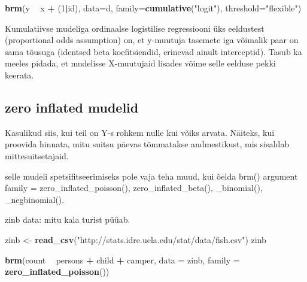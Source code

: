 \documentclass[]{book}
\newenvironment{Shaded}{\begin{snugshade}}{\end{snugshade}}
\newcommand{\DataTypeTok}[1]{\textcolor[rgb]{0.13,0.29,0.53}{#1}}
\newcommand{\DecValTok}[1]{\textcolor[rgb]{0.00,0.00,0.81}{#1}}
\newcommand{\KeywordTok}[1]{\textcolor[rgb]{0.13,0.29,0.53}{\textbf{#1}}}
\newcommand{\NormalTok}[1]{#1}
\newcommand{\OperatorTok}[1]{\textcolor[rgb]{0.81,0.36,0.00}{\textbf{#1}}}
\newcommand{\StringTok}[1]{\textcolor[rgb]{0.31,0.60,0.02}{#1}}
\begin{document}
\begin{Shaded}
\begin{Highlighting}[]
\KeywordTok{brm}\NormalTok{(y }\OperatorTok{~}\StringTok{ }\NormalTok{x }\OperatorTok{+}\StringTok{ }\NormalTok{(}\DecValTok{1}\OperatorTok{|}\NormalTok{id), }
    \DataTypeTok{data=}\NormalTok{d, }
    \DataTypeTok{family=}\KeywordTok{cumulative}\NormalTok{(}\StringTok{"logit"}\NormalTok{), }
    \DataTypeTok{threshold=}\StringTok{"flexible"}\NormalTok{)}
\end{Highlighting}
\end{Shaded}

Kumulatiivse mudeliga ordinaalse logistilise regressiooni üks eeldustest (proportional odds assumption) on, et y-muutuja tasemete iga võimalik paar on sama tõusuga (identsed beta koefitsiendid, erinevad ainult interceptid). Tasub ka meeles pidada, et mudelisse X-muutujaid lisades võime selle eelduse pekki keerata.

\hypertarget{zero-inflated-mudelid}{%
\subsection{zero inflated mudelid}\label{zero-inflated-mudelid}}

Kasulikud siis, kui teil on Y-s rohkem nulle kui võiks arvata.
Näiteks, kui proovida hinnata, mitu suitsu päevas tõmmatakse andmestikust, mis sisaldab mittesuitsetajaid.

selle mudeli spetsifitseerimiseks pole vaja teha muud, kui õelda brm() argument family = zero\_inflated\_poisson(), zero\_inflated\_beta(), \_binomial(), \_negbinomial().

zinb data: mitu kala turist püüab.

\begin{Shaded}
\begin{Highlighting}[]
\NormalTok{zinb <-}\StringTok{ }\KeywordTok{read_csv}\NormalTok{(}\StringTok{"http://stats.idre.ucla.edu/stat/data/fish.csv"}\NormalTok{)}
\NormalTok{zinb}
\end{Highlighting}
\end{Shaded}

\begin{Shaded}
\begin{Highlighting}[]
\KeywordTok{brm}\NormalTok{(count }\OperatorTok{~}\StringTok{ }\NormalTok{persons }\OperatorTok{+}\StringTok{ }\NormalTok{child }\OperatorTok{+}\StringTok{ }\NormalTok{camper, }
                 \DataTypeTok{data =}\NormalTok{ zinb, }\DataTypeTok{family =} \KeywordTok{zero_inflated_poisson}\NormalTok{())}
\end{Highlighting}
\end{Shaded}
\end{document}
